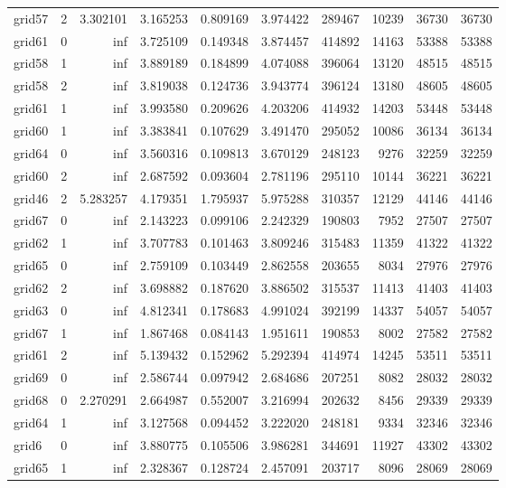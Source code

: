 \begin{longtable}{|l|r|r|r|r|r|r|r|r|r|}
grid57 & 2 & 3.302101 & 3.165253 & 0.809169 & 3.974422 & 289467 & 10239 & 36730 & 36730 \\
grid61 & 0 & inf & 3.725109 & 0.149348 & 3.874457 & 414892 & 14163 & 53388 & 53388 \\
grid58 & 1 & inf & 3.889189 & 0.184899 & 4.074088 & 396064 & 13120 & 48515 & 48515 \\
grid58 & 2 & inf & 3.819038 & 0.124736 & 3.943774 & 396124 & 13180 & 48605 & 48605 \\
grid61 & 1 & inf & 3.993580 & 0.209626 & 4.203206 & 414932 & 14203 & 53448 & 53448 \\
grid60 & 1 & inf & 3.383841 & 0.107629 & 3.491470 & 295052 & 10086 & 36134 & 36134 \\
grid64 & 0 & inf & 3.560316 & 0.109813 & 3.670129 & 248123 & 9276 & 32259 & 32259 \\
grid60 & 2 & inf & 2.687592 & 0.093604 & 2.781196 & 295110 & 10144 & 36221 & 36221 \\
grid46 & 2 & 5.283257 & 4.179351 & 1.795937 & 5.975288 & 310357 & 12129 & 44146 & 44146 \\
grid67 & 0 & inf & 2.143223 & 0.099106 & 2.242329 & 190803 & 7952 & 27507 & 27507 \\
grid62 & 1 & inf & 3.707783 & 0.101463 & 3.809246 & 315483 & 11359 & 41322 & 41322 \\
grid65 & 0 & inf & 2.759109 & 0.103449 & 2.862558 & 203655 & 8034 & 27976 & 27976 \\
grid62 & 2 & inf & 3.698882 & 0.187620 & 3.886502 & 315537 & 11413 & 41403 & 41403 \\
grid63 & 0 & inf & 4.812341 & 0.178683 & 4.991024 & 392199 & 14337 & 54057 & 54057 \\
grid67 & 1 & inf & 1.867468 & 0.084143 & 1.951611 & 190853 & 8002 & 27582 & 27582 \\
grid61 & 2 & inf & 5.139432 & 0.152962 & 5.292394 & 414974 & 14245 & 53511 & 53511 \\
grid69 & 0 & inf & 2.586744 & 0.097942 & 2.684686 & 207251 & 8082 & 28032 & 28032 \\
grid68 & 0 & 2.270291 & 2.664987 & 0.552007 & 3.216994 & 202632 & 8456 & 29339 & 29339 \\
grid64 & 1 & inf & 3.127568 & 0.094452 & 3.222020 & 248181 & 9334 & 32346 & 32346 \\
grid6 & 0 & inf & 3.880775 & 0.105506 & 3.986281 & 344691 & 11927 & 43302 & 43302 \\
grid65 & 1 & inf & 2.328367 & 0.128724 & 2.457091 & 203717 & 8096 & 28069 & 28069 \\

\end{longtable}
